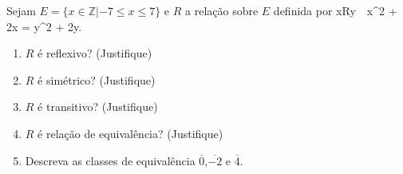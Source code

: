 \item
 Sejam $E = \{x \in \mathbb{Z}| - 7 \leqslant x \leqslant 7\}$ e $R$ a relação sobre $E$ definida por
 \ben
xRy\ \Leftrightarrow\ x^2 + 2x = y^2 + 2y.
\een
\begin{enumerate}
\item  $R$ é  reflexivo? (Justifique) 
\item  $R$ é  simétrico? (Justifique) 
\item  $R$ é  transitivo? (Justifique) 
\item  $R$ é relação de equivalência? (Justifique)
\item Descreva as classes de equivalência $\overline{0}$,$\overline{-2}$ e $\overline{4} $.
\end{enumerate}
